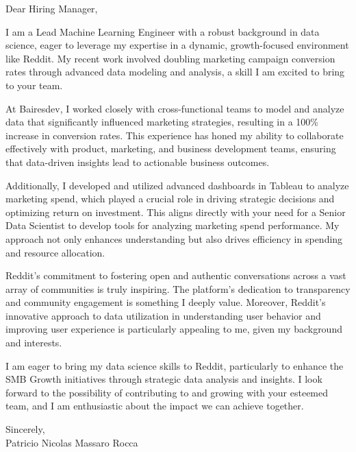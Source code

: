 \documentclass{article}
\begin{document}
\noindent Dear Hiring Manager,


I am a Lead Machine Learning Engineer with a robust background in data science, eager to leverage my expertise in a dynamic, growth-focused environment like Reddit. My recent work involved doubling marketing campaign conversion rates through advanced data modeling and analysis, a skill I am excited to bring to your team.


At Bairesdev, I worked closely with cross-functional teams to model and analyze data that significantly influenced marketing strategies, resulting in a 100\% increase in conversion rates. This experience has honed my ability to collaborate effectively with product, marketing, and business development teams, ensuring that data-driven insights lead to actionable business outcomes.


Additionally, I developed and utilized advanced dashboards in Tableau to analyze marketing spend, which played a crucial role in driving strategic decisions and optimizing return on investment. This aligns directly with your need for a Senior Data Scientist to develop tools for analyzing marketing spend performance. My approach not only enhances understanding but also drives efficiency in spending and resource allocation.


Reddit's commitment to fostering open and authentic conversations across a vast array of communities is truly inspiring. The platform's dedication to transparency and community engagement is something I deeply value. Moreover, Reddit's innovative approach to data utilization in understanding user behavior and improving user experience is particularly appealing to me, given my background and interests.


I am eager to bring my data science skills to Reddit, particularly to enhance the SMB Growth initiatives through strategic data analysis and insights. I look forward to the possibility of contributing to and growing with your esteemed team, and I am enthusiastic about the impact we can achieve together.

\vspace{1cm}
\setlength{\parskip}{0em}
\begin{flushright}
Sincerely,\\
Patricio Nicolas Massaro Rocca
\end{flushright}
\end{document}
